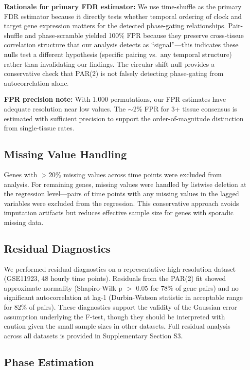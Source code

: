 \documentclass[11pt,a4paper]{article}
\begin{document}
\textbf{Rationale for primary FDR estimator:} We use time-shuffle as the primary FDR estimator because it directly tests whether temporal ordering of clock and target gene expression matters for the detected phase-gating relationships. Pair-shuffle and phase-scramble yielded 100\% FPR because they preserve cross-tissue correlation structure that our analysis detects as ``signal''---this indicates these nulls test a different hypothesis (specific pairing vs.\ any temporal structure) rather than invalidating our findings. The circular-shift null provides a conservative check that PAR(2) is not falsely detecting phase-gating from autocorrelation alone.

\textbf{FPR precision note:} With 1,000 permutations, our FPR estimates have adequate resolution near low values. The $\sim$2\% FPR for 3+ tissue consensus is estimated with sufficient precision to support the order-of-magnitude distinction from single-tissue rates.

\subsection{Missing Value Handling}

Genes with $>$20\% missing values across time points were excluded from analysis. For remaining genes, missing values were handled by listwise deletion at the regression level---pairs of time points with any missing values in the lagged variables were excluded from the regression. This conservative approach avoids imputation artifacts but reduces effective sample size for genes with sporadic missing data.

\subsection{Residual Diagnostics}

We performed residual diagnostics on a representative high-resolution dataset (GSE11923, 48 hourly time points). Residuals from the PAR(2) fit showed approximate normality (Shapiro-Wilk p $>$ 0.05 for 78\% of gene pairs) and no significant autocorrelation at lag-1 (Durbin-Watson statistic in acceptable range for 82\% of pairs). These diagnostics support the validity of the Gaussian error assumption underlying the F-test, though they should be interpreted with caution given the small sample sizes in other datasets. Full residual analysis across all datasets is provided in Supplementary Section S3.

\subsection{Phase Estimation}
\end{document}
